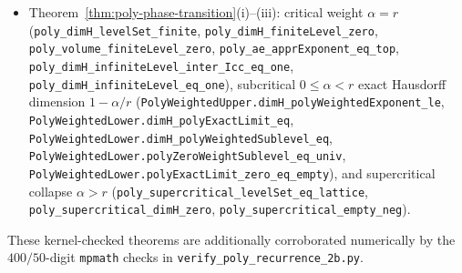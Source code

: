 \documentclass[11pt]{article}
\theoremstyle{definition}
\theoremstyle{remark}
\begin{document}
\begin{itemize}[leftmargin=1.8em]
\texttt{polyExactLevel\_\allowbreak fast\_\allowbreak gauge\_\allowbreak null},
\texttt{polyExactLevel\_\allowbreak slow\_\allowbreak gauge\_\allowbreak non\_\allowbreak sigma\_\allowbreak finite},
\texttt{polyExactLevel\_\allowbreak liminf\_\allowbreak four\_\allowbreak way},
\texttt{polyUnsignedExactLimit\_\allowbreak liminf\_\allowbreak four\_\allowbreak way}),
and signed exact-limit coset collapse
$E_{\mathrm{lim}}^{(r,c,d),\pm}(k/c)=x_k^\pm+L^{(r,c,d)}$
(\texttt{poly\_\allowbreak trichotomy\_\allowbreak part\_\allowbreak iii\_\allowbreak complete});
\item Theorem~\ref{thm:poly-phase-transition}(i)--(iii): critical weight
$\alpha=r$ (\texttt{poly\_\allowbreak dimH\_\allowbreak levelSet\_\allowbreak finite},
\texttt{poly\_\allowbreak dimH\_\allowbreak finiteLevel\_\allowbreak zero},
\texttt{poly\_\allowbreak volume\_\allowbreak finiteLevel\_\allowbreak zero},
\texttt{poly\_\allowbreak ae\_\allowbreak apprExponent\_\allowbreak eq\_\allowbreak top},
\texttt{poly\_\allowbreak dimH\_\allowbreak infiniteLevel\_\allowbreak inter\_\allowbreak Icc\_\allowbreak eq\_\allowbreak one},
\texttt{poly\_\allowbreak dimH\_\allowbreak infiniteLevel\_\allowbreak eq\_\allowbreak one}),
subcritical $0\le\alpha<r$ exact Hausdorff dimension $1-\alpha/r$
(\texttt{Poly\allowbreak Weighted\allowbreak Upper.\allowbreak dimH\_\allowbreak poly\allowbreak Weighted\allowbreak Exponent\_\allowbreak le},
\texttt{Poly\allowbreak Weighted\allowbreak Lower.\allowbreak dimH\_\allowbreak poly\allowbreak Exact\allowbreak Limit\_\allowbreak eq},
\texttt{Poly\allowbreak Weighted\allowbreak Lower.\allowbreak dimH\_\allowbreak poly\allowbreak Weighted\allowbreak Sublevel\_\allowbreak eq},
\texttt{Poly\allowbreak Weighted\allowbreak Lower.\allowbreak poly\allowbreak Zero\allowbreak Weight\allowbreak Sublevel\_\allowbreak eq\_\allowbreak univ},
\texttt{Poly\allowbreak Weighted\allowbreak Lower.\allowbreak poly\allowbreak Exact\allowbreak Limit\_\allowbreak zero\_\allowbreak eq\_\allowbreak empty}),
and supercritical collapse $\alpha>r$
(\texttt{poly\_\allowbreak supercritical\_\allowbreak levelSet\_\allowbreak eq\_\allowbreak lattice},
\texttt{poly\_\allowbreak supercritical\_\allowbreak dimH\_\allowbreak zero},
\texttt{poly\_\allowbreak supercritical\_\allowbreak empty\_\allowbreak neg}).
\end{itemize}
These kernel-checked theorems are additionally corroborated numerically by the
$400/50$-digit \texttt{mpmath} checks in
\texttt{verify\_\allowbreak poly\_\allowbreak recurrence\_\allowbreak 2b.py}.
\end{document}
